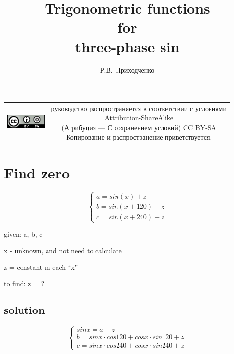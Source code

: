 \documentclass[unicode, 12pt, a4paper]{article}
\author{Р.В.~Приходченко}
\title{Trigonometric functions\\for\\three-phase sin}
\begin{document}
\maketitle



\begin{table}[ht]
  \begin{tabular}{cc}
    \includegraphics[width=2cm]{../CC_BY-SA_88x31.png} &
    \shortstack{руководство распространяется в соответствии с
      условиями\\
      \href{http://creativecommons.org/licenses/by-sa/3.0/}{Attribution-ShareAlike} \\
      (Атрибуция — С сохранением условий) CC BY-SA \\
      Копирование и распространение приветствуется.}
  \end{tabular}
\end{table}


\section{Find zero}

\begin{equation}
  \label{eq:zero:three-phase-case}
  \begin{cases}
    a = sin(x)       + z\\
    b = sin(x + 120) + z\\
    c = sin(x + 240) + z
  \end{cases}
\end{equation}

given: a, b, c

x - unknown, and not need to calculate

z = constant in each ``x''

to find: z = ?


\subsection{solution}

\begin{equation}
  \begin{cases}
    sin x = a - z\\
    b = sin x \cdot cos 120 + cos x \cdot sin 120 + z\\
    c = sin x \cdot cos 240 + cos x \cdot sin 240 + z
  \end{cases}
\end{equation}
\end{document}
